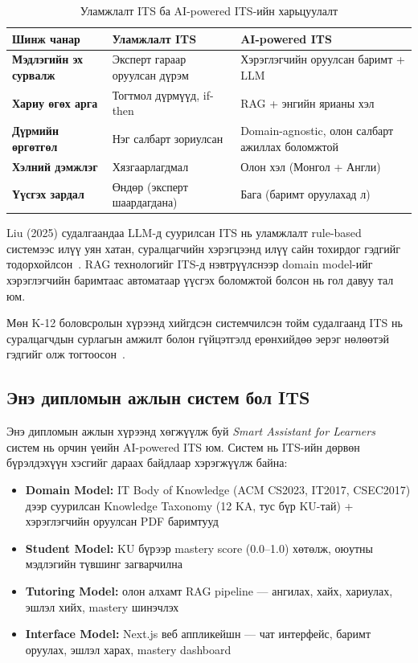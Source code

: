 \documentclass[12pt,A4]{report}
\newcommand{\eng}[1]{#1}
\newcommand{\term}[1]{\textit{#1}}
\begin{document}
\begin{table}[h!]
\centering
\caption{Уламжлалт ITS ба AI-powered ITS-ийн харьцуулалт}
\label{tab:its_comparison}
\begin{tabularx}{\textwidth}{>{\bfseries}l X X}
\toprule
\textbf{Шинж чанар} & \textbf{Уламжлалт ITS} & \textbf{AI-powered ITS} \\
\midrule
\rowcolor{lightbg}
Мэдлэгийн эх сурвалж & Эксперт гараар оруулсан дүрэм & Хэрэглэгчийн оруулсан баримт + LLM \\
Хариу өгөх арга & Тогтмол дүрмүүд, \eng{if-then} & RAG + энгийн ярианы хэл \\
\rowcolor{lightbg}
Дүрмийн өргөтгөл & Нэг салбарт зориулсан & \eng{Domain-agnostic}, олон салбарт ажиллах боломжтой \\
Хэлний дэмжлэг & Хязгаарлагдмал & Олон хэл (Монгол + Англи) \\
\rowcolor{lightbg}
Үүсгэх зардал & Өндөр (эксперт шаардагдана) & Бага (баримт оруулахад л) \\
\bottomrule
\end{tabularx}
\end{table}

\eng{Liu} (2025) судалгаандаа LLM-д суурилсан ITS нь уламжлалт \eng{rule-based} системээс илүү уян хатан, суралцагчийн хэрэгцээнд илүү сайн тохирдог гэдгийг тодорхойлсон~\cite{liu2025}. RAG технологийг ITS-д нэвтрүүлснээр \eng{domain model}-ийг хэрэглэгчийн баримтаас автоматаар үүсгэх боломжтой болсон нь гол давуу тал юм.

Мөн K-12 боловсролын хүрээнд хийгдсэн системчилсэн тойм судалгаанд ITS нь суралцагчдын сурлагын амжилт болон гүйцэтгэлд ерөнхийдөө эерэг нөлөөтэй гэдгийг олж тогтоосон~\cite{karran2025}.

\subsection{Энэ дипломын ажлын систем бол ITS}

Энэ дипломын ажлын хүрээнд хөгжүүлж буй \term{\eng{Smart Assistant for Learners}} систем нь орчин үеийн AI-powered ITS юм. Систем нь ITS-ийн дөрвөн бүрэлдэхүүн хэсгийг дараах байдлаар хэрэгжүүлж байна:

\begin{itemize}
    \item \textbf{\eng{Domain Model}:} IT \eng{Body of Knowledge} (ACM CS2023, IT2017, CSEC2017) дээр суурилсан \eng{Knowledge Taxonomy} (12 KA, тус бүр KU-тай) + хэрэглэгчийн оруулсан PDF баримтууд
    \item \textbf{\eng{Student Model}:} KU бүрээр \eng{mastery score} (0.0--1.0) хөтөлж, оюутны мэдлэгийн түвшинг загварчилна
    \item \textbf{\eng{Tutoring Model}:} олон алхамт RAG \eng{pipeline} — ангилах, хайх, хариулах, эшлэл хийх, \eng{mastery} шинэчлэх
    \item \textbf{\eng{Interface Model}:} \eng{Next.js} веб аппликейшн — чат интерфейс, баримт оруулах, эшлэл харах, \eng{mastery dashboard}
\end{itemize}
\end{document}
